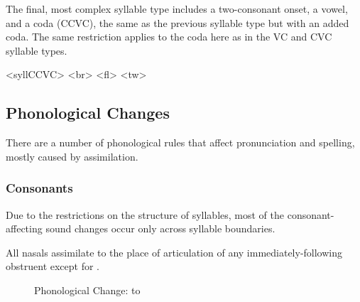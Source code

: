 The final, most complex syllable type includes a two-consonant onset, a vowel, and a coda (CCVC), the same as the previous syllable type but with an added coda. The same restriction applies to the coda here as in the VC and CVC syllable types.


\pex<syllCCVC>
	\a<br>    
	\a<fl>    
	\a<tw>    
\xe


\subsection{Phonological Changes}
\label{sec:phonological-changes}

There are a number of phonological rules that affect \lang{} pronunciation and spelling, mostly caused by assimilation.

\subsubsection{Consonants}

Due to the restrictions on the structure of syllables, most of the consonant-affecting sound changes occur only across syllable boundaries.

All nasals assimilate to the place of articulation of any immediately-following obstruent except for .

\begin{figure}[h]\centering
	\caption{Phonological Change:  to }
	\label{fig:m-to-n-change}
\end{figure}

